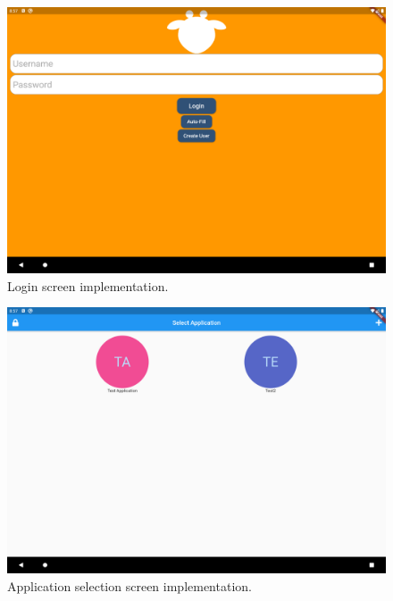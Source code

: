 \begin{figure}[H]
    \includegraphics[width=\textwidth]{Sprint_1/images/login_screen_app.png}
    \caption{Login screen implementation.}
    \label{login_screen_design_app}
\end{figure}

\begin{figure}[H]
    \includegraphics[width=\textwidth]{Sprint_1/images/app_selection_screen_app.png}
    \caption{Application selection screen implementation.}
    \label{app_selection_screen_app}
\end{figure}

